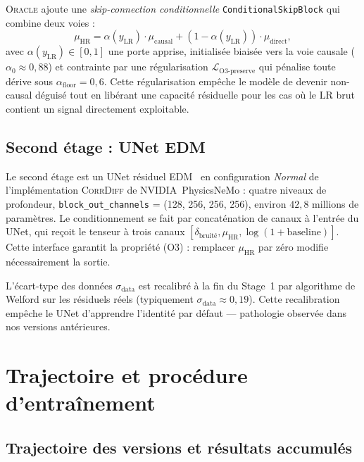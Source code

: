 \documentclass[14pt,a4paper,openany]{extreport}
\theoremstyle{definition}
\newcommand{\Oracle}{\textsc{Oracle}}
\newcommand{\CorrDiff}{\textsc{CorrDiff}}
\newcommand{\LR}{\ensuremath{\text{LR}}}
\newcommand{\HR}{\ensuremath{\text{HR}}}
\newcommand{\yLR}{\ensuremath{y_{\LR}}}
\newcommand{\muHR}{\ensuremath{\mu_{\HR}}}
\begin{document}
\Oracle{} ajoute une \emph{skip-connection conditionnelle} \texttt{ConditionalSkipBlock} qui combine deux voies :
\begin{equation}
  \muHR = \alpha(\yLR) \cdot \mu_{\mathrm{causal}} + (1 - \alpha(\yLR)) \cdot \mu_{\mathrm{direct}},
  \label{eq:exp-skip}
\end{equation}
avec $\alpha(\yLR) \in [0, 1]$ une porte apprise, initialisée biaisée vers la voie causale ($\alpha_0 \approx 0{,}88$) et contrainte par une régularisation $\mathcal{L}_{\mathrm{O3\text{-}preserve}}$ qui pénalise toute dérive sous $\alpha_{\mathrm{floor}} = 0{,}6$. Cette régularisation empêche le modèle de devenir non-causal déguisé tout en libérant une capacité résiduelle pour les cas où le \LR{} brut contient un signal directement exploitable.

\subsection{Second étage : UNet EDM}
\label{ssec:exp-topo-stage2}

Le second étage est un UNet résiduel EDM~\cite{karras_edm_2022} en configuration \emph{Normal} de l'implémentation \CorrDiff{} de NVIDIA~PhysicsNeMo : quatre niveaux de profondeur, \texttt{block\_out\_channels} = (128, 256, 256, 256), environ $42{,}8$ millions de paramètres. Le conditionnement se fait par concaténation de canaux à l'entrée du UNet, qui reçoit le tenseur à trois canaux $[\delta_{\mathrm{bruité}}, \muHR, \log(1 + \mathrm{baseline})]$. Cette interface garantit la propriété (O3) : remplacer $\muHR$ par zéro modifie nécessairement la sortie.

L'écart-type des données $\sigma_{\mathrm{data}}$ est recalibré à la fin du Stage~1 par algorithme de Welford sur les résiduels réels (typiquement $\sigma_{\mathrm{data}} \approx 0{,}19$). Cette recalibration empêche le UNet d'apprendre l'identité par défaut --- pathologie observée dans nos versions antérieures.

\section{Trajectoire et procédure d'entraînement}
\label{sec:exp-traj}

\subsection{Trajectoire des versions et résultats accumulés}
\label{ssec:exp-traj-trajectoire}
\end{document}
